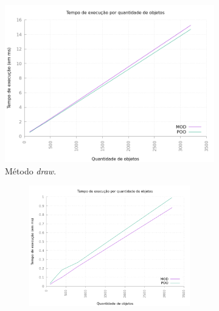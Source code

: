 \newpage

\begin{figure}[h!]
    \centering
    \begin{subfigure}[b]{\textwidth}
        \includegraphics[width=\textwidth]{../figuras/drawv1graph}
        \caption{Método \textit{draw}.}
        \label{drawv1graph}
    \end{subfigure}
    \begin{subfigure}[b]{\textwidth}
        \begin{subfigure}[b]{.5\textwidth}
            \includegraphics[width=\textwidth]{../figuras/updatev1graph}

\end{subfigure}
\end{subfigure}
\end{figure}
